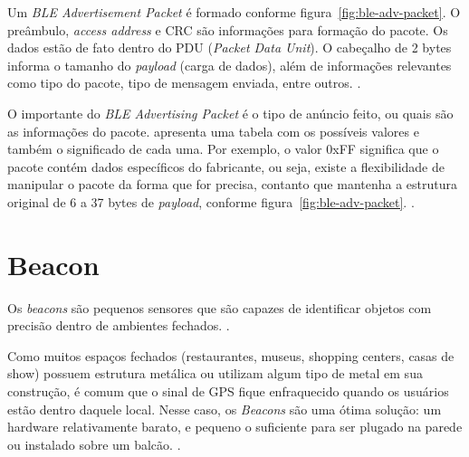\documentclass[
	12pt,				%
	openright,			%
	oneside,			%
	a4paper,			%
	chapter=TITLE,		%
	english,			%
	brazil				%
	]{abntex2}
\begin{document}
{Um \textit{BLE Advertisement Packet} é formado conforme figura~\ref{fig:ble-adv-packet}. O preâmbulo, \textit{access address} e CRC são informações para formação do pacote. Os dados estão de fato dentro do PDU (\textit{Packet Data Unit}). O cabeçalho de 2 bytes informa o tamanho do \textit{payload} (carga de dados), além de informações relevantes como tipo do pacote, tipo de mensagem enviada, entre outros. \cite{ble-packets}.

\begin{figure}[htb]
\end{figure}

O importante do \textit{BLE Advertising Packet} é o tipo de anúncio feito, ou quais são as informações do pacote.  apresenta uma tabela com os possíveis valores e também o significado de cada uma. Por exemplo, o valor 0xFF significa que o pacote contém dados específicos do fabricante, ou seja, existe a flexibilidade de manipular o pacote da forma que for precisa, contanto que mantenha a estrutura original de 6 a 37 bytes de \textit{payload}, conforme figura~\ref{fig:ble-adv-packet}. \cite{ble-packets}.

\section{Beacon}

Os \textit{beacons} são pequenos sensores que são capazes de identificar objetos com precisão dentro de ambientes fechados. \cite{teixeira-beacon}.

\begin{citacao}
Como muitos espaços fechados (restaurantes, museus, shopping centers, casas de show) possuem estrutura metálica ou utilizam algum tipo de metal em sua construção, é comum que o sinal de GPS fique enfraquecido quando os usuários estão dentro daquele local. Nesse caso, os \textit{Beacons} são uma ótima solução: um hardware relativamente barato, e pequeno o suficiente para ser plugado na parede ou instalado sobre um balcão. \cite{teixeira-beacon}.
\end{citacao}

}
\end{document}
